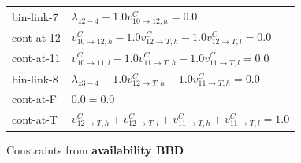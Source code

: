 \documentclass[11pt]{article}
\begin{document}
\begin{tabular}{l l}
   bin-link-7 & $\lambda_{z2-4} -1.0 v^C_{10 \rightarrow 12, h} = 0.0$\\
   cont-at-12 & $v^C_{10 \rightarrow 12, h} -1.0 v^C_{12 \rightarrow T, h} -1.0 v^C_{12 \rightarrow T, l} = 0.0$\\
   cont-at-11 & $v^C_{10 \rightarrow 11, l} -1.0 v^C_{11 \rightarrow T, h} -1.0 v^C_{11 \rightarrow T, l} = 0.0$\\
   bin-link-8 & $\lambda_{z3-4} -1.0 v^C_{12 \rightarrow T, h} -1.0 v^C_{11 \rightarrow T, h} = 0.0$\\
   cont-at-F & $0.0 = 0.0$\\
   cont-at-T & $v^C_{12 \rightarrow T, h} + v^C_{12 \rightarrow T, l} + v^C_{11 \rightarrow T, h} + v^C_{11 \rightarrow T, l} = 1.0$
\end{tabular}

\newpage Constraints from \textbf{availability BBD}\\
\end{document}
